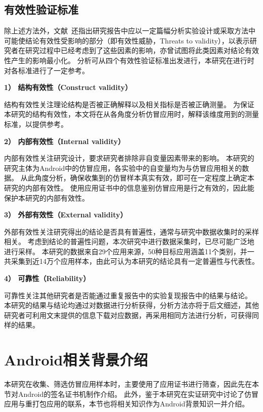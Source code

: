\subsection{有效性验证标准}
除上述方法外，文献~\cite{easterbrook2008selecting}还指出研究报告中应以一定篇幅分析实验设计或采取方法中可能使结论有效性受影响的部分（即有效性威胁，Threats to validity），以表示研究者在研究过程中已经考虑到了这些因素的影响，亦曾试图将此类因素对结论有效性产生的影响最小化。
分析可从四个有效性验证标准出发进行，本研究在进行时对各标准进行了一定参考。

\textbf{1） 结构有效性（Construct validity）}

结构有效性关注理论结构是否被正确解释以及相关指标是否被正确测量。
为保证本研究的结构有效性，本文将在从各角度分析仿冒应用时，解释该维度用到的测量标准，以提供参考。

\textbf{2） 内部有效性（Internal validity）}

内部有效性关注研究设计，要求研究者排除非自变量因素带来的影响。
本研究的研究主体为Android中的仿冒应用，各实验中的自变量均为与仿冒应用相关的数据。
从此角度分析，确保收集到的仿冒样本真实有效，即可在一定程度上确定本研究的内部有效性。
使用应用证书中的信息鉴别仿冒应用是行之有效的，因此能保护本研究的内部有效性。

\textbf{3） 外部有效性（External validity）}

外部有效性关注研究得出的结论是否具有普遍性，通常与研究中数据收集时的采样相关。
考虑到结论的普遍性问题，本次研究中进行数据采集时，已尽可能广泛地进行采样。
本研究的数据来自29个应用来源，50种目标应用涵盖11个类别，并一共采集到近14万个应用样本，由此可认为本研究的结论具有一定普遍性与代表性。

\textbf{4） 可靠性（Reliability）}

可靠性关注其他研究者是否能通过重复报告中的实验复现报告中的结果与结论。
本研究的结果与结论均通过对数据进行分析获得，分析方法亦将于后文细述，其他研究者可利用文末提供的信息下载对应数据，再采用相同方法进行分析，可获得同样的结果。

\section{Android相关背景介绍}

本研究在收集、筛选仿冒应用样本时，主要使用了应用证书进行筛查，因此先在本节对Android的签名证书机制作介绍。
此外，鉴于本研究在实证研究中讨论了仿冒应用与重打包应用的联系，本节也将相关知识作为Android背景知识一并介绍。

